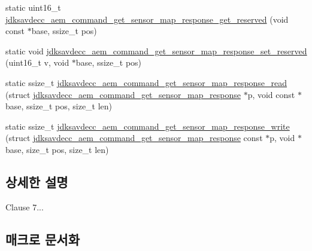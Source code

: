 \begin{DoxyCompactItemize}
\item 
static uint16\+\_\+t \hyperlink{group__command__get__sensor__map__response_gaccf1b4ee6da57af0e80a220a959c3243}{jdksavdecc\+\_\+aem\+\_\+command\+\_\+get\+\_\+sensor\+\_\+map\+\_\+response\+\_\+get\+\_\+reserved} (void const $\ast$base, ssize\+\_\+t pos)
\item 
static void \hyperlink{group__command__get__sensor__map__response_ga0acb473714ad30dd9beb1be56009a5db}{jdksavdecc\+\_\+aem\+\_\+command\+\_\+get\+\_\+sensor\+\_\+map\+\_\+response\+\_\+set\+\_\+reserved} (uint16\+\_\+t v, void $\ast$base, ssize\+\_\+t pos)
\item 
static ssize\+\_\+t \hyperlink{group__command__get__sensor__map__response_ga5399514c9e1dbd5e7d612398555fc0c7}{jdksavdecc\+\_\+aem\+\_\+command\+\_\+get\+\_\+sensor\+\_\+map\+\_\+response\+\_\+read} (struct \hyperlink{structjdksavdecc__aem__command__get__sensor__map__response}{jdksavdecc\+\_\+aem\+\_\+command\+\_\+get\+\_\+sensor\+\_\+map\+\_\+response} $\ast$p, void const $\ast$base, ssize\+\_\+t pos, size\+\_\+t len)
\item 
static ssize\+\_\+t \hyperlink{group__command__get__sensor__map__response_ga6af64ce7a35ce0aff4340d8a98eebe3c}{jdksavdecc\+\_\+aem\+\_\+command\+\_\+get\+\_\+sensor\+\_\+map\+\_\+response\+\_\+write} (struct \hyperlink{structjdksavdecc__aem__command__get__sensor__map__response}{jdksavdecc\+\_\+aem\+\_\+command\+\_\+get\+\_\+sensor\+\_\+map\+\_\+response} const $\ast$p, void $\ast$base, size\+\_\+t pos, size\+\_\+t len)
\end{DoxyCompactItemize}


\subsection{상세한 설명}
Clause 7... 

\subsection{매크로 문서화}
